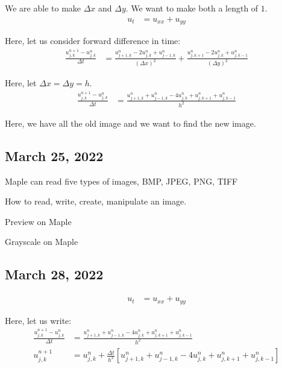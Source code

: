 \documentclass{article}
\begin{document}

We are able to make $\Delta x$ and $\Delta y$. We want to make both a length of $1$.
%
\begin{align}
  u_t & = u_{xx} + u_{yy}
\end{align}

Here, let us consider forward difference in time:
%
\begin{align}
  \frac
  {u^{n + 1}_{j, k} - u^n_{j, k}}
  {\Delta t}
  & =
  \frac
  {
  u^n_{j+1, k} - 2u^n_{j, k} + u^n_{j - 1, k}
  }
  {
  (\Delta x)^2
  }
  +
  \frac
  {
  u^n_{j, k+1} - 2u^n_{j, k} + u^n_{j, k - 1}
  }
  {
  (\Delta y)^2
  }
\end{align}

Here, let $\Delta x = \Delta y = h$.
%
\begin{align}
  \frac
  {u^{n + 1}_{j, k} - u^n_{j, k}}
  {\Delta t}
  & = \frac
  {
  u^n_{j+1, k} + u^n_{j-1, k} - 4u^n_{j, k} + u^n_{j, k+1} + u^n_{j, k-1}
  }
  {h^2}
\end{align}

Here, we have all the old image and we want to find the new image.

\subsection*{March 25, 2022}


Maple can read five types of images, BMP, JPEG, PNG, TIFF

How to read, write, create, manipulate an image.

Preview on Maple

Grayscale on Maple

\subsection*{March 28, 2022}
%
\begin{align}
  u_t & = u_{xx} + u_{yy}
\end{align}

Here, let us write:
%
\begin{align}
  \frac{u^{n + 1}_{j, k} - u^n_{j, k}}{\Delta t}
  & =
  \frac{u^n_{j+1, k} + u^n_{j-1, k} - 4u^n_{j, k} + u^n_{j, k+1} + u^n_{j, k - 1}}{h^2}\\
  u^{n + 1}_{j, k}
  & = u^n_{j, k} + \frac{\Delta t}{h^2}
  \left[
    u^n_{j+1, k} + u^n_{j - 1, k} - 4u^n_{j, k} + u^n_{j, k+1} + u^n_{j, k -1}
  \right]
\end{align}
\end{document}
